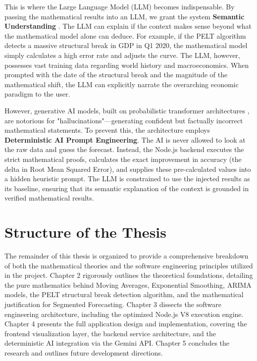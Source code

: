 This is where the Large Language Model (LLM) becomes indispensable. By passing the mathematical results into an LLM, we grant the system \textbf{Semantic Understanding} \cite{Korinek2025}. The LLM can explain if the context makes sense beyond what the mathematical model alone can deduce. For example, if the PELT algorithm detects a massive structural break in GDP in Q1 2020, the mathematical model simply calculates a high error rate and adjusts the curve. The LLM, however, possesses vast training data regarding world history and macroeconomics. When prompted with the date of the structural break and the magnitude of the mathematical shift, the LLM can explicitly narrate the overarching economic paradigm to the user.

However, generative AI models, built on probabilistic transformer architectures \cite{Vaswani2017}, are notorious for "hallucinations"—generating confident but factually incorrect mathematical statements. To prevent this, the architecture employs \textbf{Deterministic AI Prompt Engineering}. The AI is never allowed to look at the raw data and guess the forecast. Instead, the Node.js backend executes the strict mathematical proofs, calculates the exact improvement in accuracy (the delta in Root Mean Squared Error), and supplies these pre-calculated values into a hidden heuristic prompt. The LLM is constrained to use the injected results as its baseline, ensuring that its semantic explanation of the context is grounded in verified mathematical results.

\section{Structure of the Thesis}
The remainder of this thesis is organized to provide a comprehensive breakdown of both the mathematical theories and the software engineering principles utilized in the project. Chapter 2 rigorously outlines the theoretical foundations, detailing the pure mathematics behind Moving Averages, Exponential Smoothing, ARIMA models, the PELT structural break detection algorithm, and the mathematical justification for Segmented Forecasting. Chapter 3 dissects the software engineering architecture, including the optimized Node.js V8 execution engine. Chapter 4 presents the full application design and implementation, covering the frontend visualization layer, the backend service architecture, and the deterministic AI integration via the Gemini API. Chapter 5 concludes the research and outlines future development directions.
